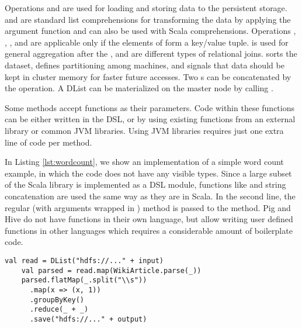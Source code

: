Operations  and  are used for loading and storing data to the persistent storage.  and  are standard list comprehensions for transforming the data by applying the argument function and can also be used with Scala  comprehensions. Operations , , ,  and  are applicable only if the elements of  form a key/value tuple.  is used for general aggregation after the ,  and  are different types of relational joins.  sorts the dataset,  defines partitioning among machines, and  signals that data should be kept in cluster memory for faster future accesses. Two s can be concatenated by the \code{++} operation. A DList can be materialized on the master node by calling .

Some methods accept functions as their parameters. Code within these functions can be either written in the \tool DSL, or by using existing functions from an external library or common JVM libraries. Using JVM libraries requires just one extra line of code per method.  

In Listing \ref{lst:wordcount}, we show an implementation of a simple word count example, in which the code does not have any visible  types. Since a large subset of the Scala library is implemented as a DSL module, functions like  and string concatenation are used the same way as they are in Scala. In the second line, the regular (with arguments wrapped in ) method  is passed to the  method. Pig and Hive do not have functions in their own language, but allow writing user defined functions in other languages which requires a considerable amount of boilerplate code.

\begin{lstlisting}[name=code, caption=Example of word count program where type inference removes the need to declare any \scode{Rep} types., captionpos=b, label=lst:wordcount, float=t]
    val read = DList("hdfs://..." + input)
    val parsed = read.map(WikiArticle.parse(_))
    parsed.flatMap(_.split("\\s"))
      .map(x => (x, 1))
      .groupByKey()
      .reduce(_ + _)
      .save("hdfs://..." + output)
\end{lstlisting}

